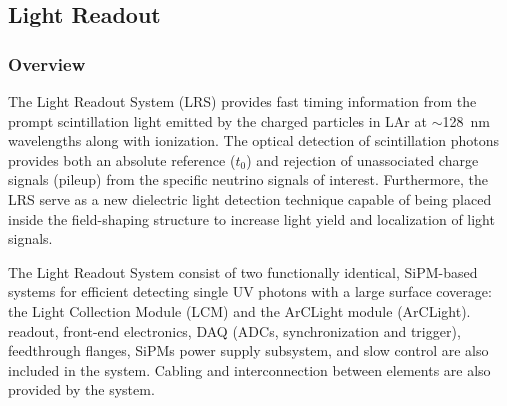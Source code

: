 

\subsection{Light Readout}
\label{sec:lartpc-des-lightro}

\subsubsection{Overview}
The Light Readout System (LRS) provides fast timing information from the prompt scintillation light emitted by the charged particles in LAr at $\sim$\SI{128}{\nano\metre} wavelengths along with ionization. The optical detection of scintillation photons provides both an absolute reference ($t_0$) and rejection of unassociated charge signals (pileup) from the specific neutrino signals of interest. Furthermore, the LRS serve as a new dielectric light detection technique capable of being placed inside the field-shaping structure to increase light yield and localization of light signals.

The Light Readout System consist of two functionally identical, SiPM-based systems for efficient detecting single UV photons with a large surface coverage: the Light Collection Module (LCM) and the ArCLight module (ArCLight). readout, front-end electronics, DAQ (ADCs, synchronization and trigger), feedthrough flanges, SiPMs power supply subsystem, and slow control are also included in the system. Cabling and interconnection between elements are also provided by the system.

